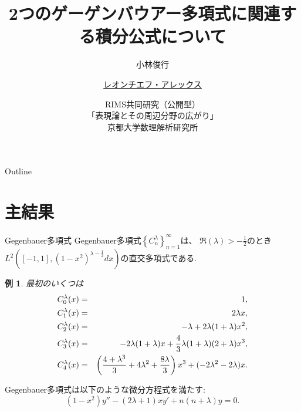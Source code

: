 \documentclass[pdf,notes]{beamer}
\title[2つのゲーゲンバウアー多項式に\dots]{2つのゲーゲンバウアー多項式に関連する積分公式について}
\author[レオンチエフ・アレックス]{小林俊行\inst{1} \and \underline{レオンチエフ・アレックス}\inst{2}}
\institute[東大] %
{
  \inst{1}%
  大学院数理科学研究科、カブリ数物連携宇宙研究機構\\
  東京大学
  \and
  \inst{2}%
  大学院数理科学研究科\\
  東京大学
  }
\date[表現論とその周辺分野\dots]{RIMS共同研究（公開型）\\「表現論とその周辺分野の広がり」\\京都大学数理解析研究所}
\newtheorem*{example*}{例}
\begin{document}
\begin{frame}\titlepage\end{frame}

\begin{frame}{Outline}
	\tableofcontents
\end{frame}
\section{主結果}
\begin{frame}{Gegenbauer多項式}%
	Gegenbauer多項式$\left\{ C_n^\lambda \right\}_{n=1}^{\infty}$は、
	$\Re(\lambda)>-\frac{1}{2}$のとき$L^2\left( [-1,1],(1-x^2)^{\lambda-\frac{1}{2}}dx \right)$の直交多項式である.
	\vspace{-0.2cm}
	\begin{example*}
		最初のいくつは
	\vspace{-0.3cm}
		\begin{eqnarray*}
	\vspace{-0.2cm}
			C_0^\lambda(x)&=&1,\\
			C_1^\lambda(x)&=&2\lambda x,\\
			C_2^\lambda(x)&=&-\lambda+2\lambda(1+\lambda)x^2,\\
			C_3^\lambda(x)&=&-2\lambda(1+\lambda)x+\frac{4}{3}\lambda(1+\lambda)(2+\lambda)x^3,\\
			C_4^\lambda(x)&=&\left(\frac{4+\lambda^3}{3}+4\lambda^2+\frac{8\lambda}{3}  \right)x^3+(-2\lambda^2-2\lambda)x.
		\end{eqnarray*}
	\end{example*}
	Gegenbauer多項式は以下のような微分方程式を満たす:
		\vspace{-0.2cm}
	\begin{equation*}
		(1-x^2)y''-(2\lambda+1)xy'+n(n+\lambda)y=0.
	\end{equation*}
\end{frame}
\end{document}
